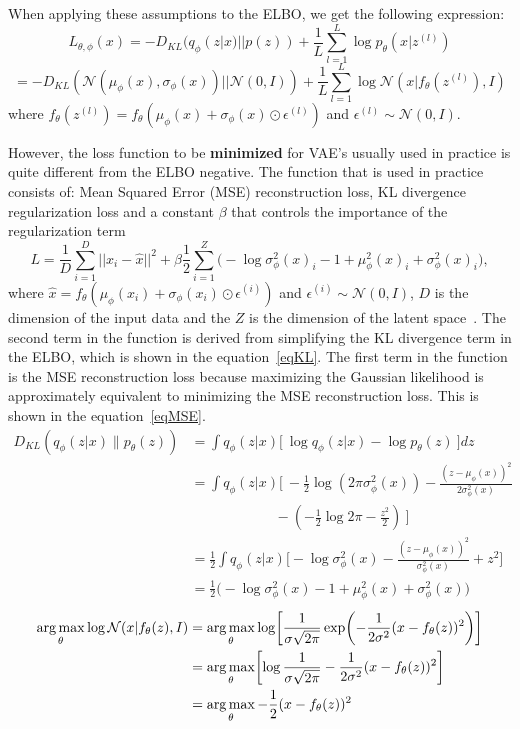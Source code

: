 When applying these assumptions to the ELBO, we get the following expression: \[ L_{\theta, \phi}(x) = - D_{KL}(q_{\phi}(z|x) || p(z)) + \frac{1}{L} \sum_{l=1}^{L} \log p_{\theta}(x|z^{(l)}) \]
\[ = - D_{KL}(\mathcal{N}(\mu_{\phi}(x), \sigma_{\phi}(x)) || \mathcal{N}(0, I)) + \frac{1}{L} \sum_{l=1}^{L} \log \mathcal{N}(x|f_{\theta}(z^{(l)}), I) \]
where $f_{\theta}(z^{(l)}) = f_{\theta}(\mu_{\phi}(x) + \sigma_{\phi}(x) \odot \epsilon^{(l)})$ and $\epsilon^{(l)} \sim \mathcal{N}(0, I)$.

However, the loss function to be \textbf{minimized} for VAE's usually used in practice is quite different from the ELBO negative. 
The function that is used in practice consists of: Mean Squared Error (MSE) reconstruction loss, KL divergence regularization loss and a constant $\beta$ that controls the importance of the regularization term
\[ L = \frac{1}{D} \sum_{i=1}^{D} ||x_i - \hat{x} ||^2 + \beta  \frac{1}{2} \sum_{i=1}^{Z} \biggl( -\log \sigma^2_\phi(x)_i - 1 + \mu^2_\phi(x)_i + \sigma^2_\phi(x)_i \biggr), \]
where $\hat{x} = f_{\theta}(\mu_{\phi}(x_i) + \sigma_{\phi}(x_i) \odot \epsilon^{(i)})$ and $\epsilon^{(i)} \sim \mathcal{N}(0, I)$, $D$ is the dimension of the input data and the $Z$ is the dimension of the latent space~\cite{Kingma_2019,betavae}. The second term in the function is derived from simplifying the KL divergence term in the ELBO, which is shown in the equation~\ref{eqKL}. The first term in the function is the MSE reconstruction loss because maximizing the Gaussian likelihood is approximately equivalent to minimizing the MSE reconstruction loss. This is shown in the equation~\ref{eqMSE}.
\begin{equation} \label{eqKL}
    \begin{split}
        D_{KL}(q_\phi(z|x) \| p_\theta(z)) &= \int q_\phi(z|x) \biggl[\ \log q_\phi(z|x) - \log p_\theta(z) \ \biggr] dz \\
        &= \int q_\phi(z|x) \biggl[\ -\frac{1}{2} \log (2\pi\sigma^2_\phi(x)) - \frac{(z - \mu_\phi(x))^2}{2\sigma^2_\phi(x)} \\
        &\qquad\qquad\qquad - \left( -\frac{1}{2} \log 2\pi - \frac{z^2}{2} \right) \ \biggr] \\
        &= \frac{1}{2} \int q_\phi(z|x) \biggl[ -\log \sigma^2_\phi(x) - \frac{(z - \mu_\phi(x))^2}{\sigma^2_\phi(x)} + z^2 \biggr] \\
        &= \frac{1}{2} \biggl( -\log \sigma^2_\phi(x) - 1 + \mu^2_\phi(x) + \sigma^2_\phi(x) \biggr)
    \end{split}
\end{equation}
\begin{equation} \label{eqMSE}
    \begin{split}
        \operatorname*{arg\,max}_{\theta} \log \mathcal{N}(x|f_{\theta}(z), I) & = \operatorname*{arg\,max}_{\theta} \log \biggl[\frac{1}{\sigma \sqrt{2\pi}} \exp \biggl( -\frac{1}{2 \sigma^2} (x - f_{\theta}(z))^2 \biggr)\biggr] \\
        & = \operatorname*{arg\,max}_{\theta} \biggl[ \log \frac{1}{\sigma \sqrt{2\pi}} - \frac{1}{2 \sigma^2} (x - f_{\theta}(z))^2 \biggl]\\
        & = \operatorname*{arg\,max}_{\theta} -\frac{1}{2} (x - f_{\theta}(z))^2
    \end{split}
\end{equation}

